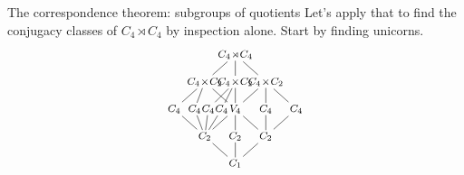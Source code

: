 \documentclass[8pt]{beamer}
\begin{document}
\begin{frame}{The correspondence theorem: subgroups of quotients}
  Let's apply that to find the conjugacy classes of $C_4\!\rtimes\!C_4$
  by inspection alone. Start by finding unicorns.
  \[
  \begin{tikzpicture}[shorten >= -2pt, shorten <= -2pt,xscale=1.2,scale=.7]
    \tikzstyle{every node}=[font=\footnotesize]
    \begin{scope}[shift={(0,0)},scale=.75,yscale=1.6,scale=.9]
      \node (G) at (0,4) {$C_4\!\rtimes\!C_4$};
      \node (C4xC2-1) at (-1.5,3) {$C_4\!\times\!C_2$};
      \node (C4xC2-2) at (0,3) {$C_4\!\times\!C_2$};
      \node (C4xC2-3) at (1.5,3) {$C_4\!\times\!C_2$};
      \node (C4-1) at (-3,2) {$C_4$};
      \node (C4-2) at (-2,2) {$C_4$};
      \node (C4-3) at (-1.33,2) {$C_4$};
      \node (C4-4) at (-.67,2) {$C_4$};
      \node (C4-5) at (1.5,2) {$C_4$};
      \node (C4-6) at (3,2) {$C_4$};
      \node (V4) at (0,2) {$V_4$};
      \node (C2-1) at (-1.5,1) {$C_2$};
      \node (C2-2) at (0,1) {$C_2$};
      \node (C2-3) at (1.5,1) {$C_2$};
      \node (1) at (0,0) {$C_1$};
      \draw (G) to (C4xC2-1);
      \draw (G) to (C4xC2-2);
      \draw (G) to (C4xC2-3);
      \draw (C4xC2-1) to (C4-1);
      \draw (C4xC2-1) to (C4-2);
      \draw (C4xC2-1) to (V4); 
      \draw (C4xC2-2) to (C4-3);
      \draw (C4xC2-2) to (C4-4);
      \draw (C4xC2-2) to (V4); 
      \draw (C4xC2-3) to (C4-5);
      \draw (C4xC2-3) to (C4-6);
      \draw (C4xC2-3) to (V4);
      \draw (C4-1) to (C2-1); \draw (C4-2) to (C2-1);
      \draw (C4-3) to (C2-1); \draw (C4-4) to (C2-1);
      \draw (V4) to (C2-1); 
      \draw (V4) to (C2-2); \draw (V4) to (C2-3);
      \draw (C4-5) to (C2-3); \draw (C4-6) to (C2-3);
      \draw (C2-1) to (1); 
      \draw (C2-2) to (1); 
      \draw (C2-3) to (1);
    \end{scope}
  \end{tikzpicture}
  \]
  
\end{frame}

\end{document}
